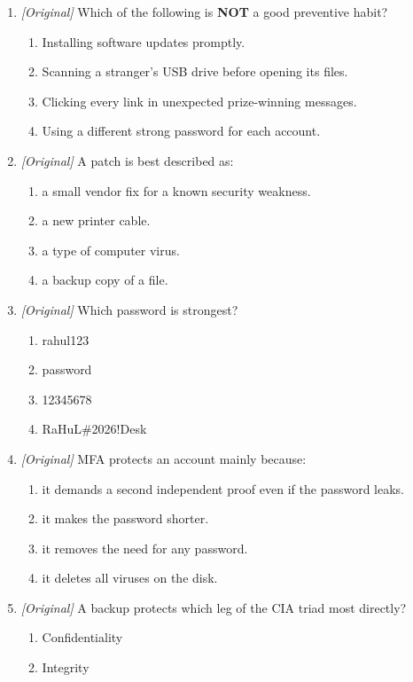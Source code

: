 \documentclass[11pt]{article}
\begin{document}
\begin{enumerate}[label=\textbf{Q\arabic*.}, leftmargin=*]
\item \textit{[Original]} Which of the following is \textbf{NOT} a good
  preventive habit?
  \begin{enumerate}[label=\Alph*.]
    \item Installing software updates promptly.
    \item Scanning a stranger's USB drive before opening its files.
    \item Clicking every link in unexpected prize-winning messages.
    \item Using a different strong password for each account.
  \end{enumerate}
\item \textit{[Original]} A patch is best described as:
  \begin{enumerate}[label=\Alph*.]
    \item a small vendor fix for a known security weakness.
    \item a new printer cable.
    \item a type of computer virus.
    \item a backup copy of a file.
  \end{enumerate}
\item \textit{[Original]} Which password is strongest?
  \begin{enumerate}[label=\Alph*.]
    \item rahul123
    \item password
    \item 12345678
    \item RaHuL\#2026!Desk
  \end{enumerate}
\item \textit{[Original]} MFA protects an account mainly because:
  \begin{enumerate}[label=\Alph*.]
    \item it demands a second independent proof even if the password leaks.
    \item it makes the password shorter.
    \item it removes the need for any password.
    \item it deletes all viruses on the disk.
  \end{enumerate}
\item \textit{[Original]} A backup protects which leg of the CIA triad most
  directly?
  \begin{enumerate}[label=\Alph*.]
    \item Confidentiality
    \item Integrity

\end{enumerate}
\end{enumerate}
\end{document}

